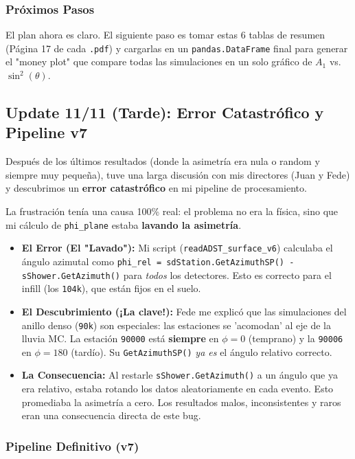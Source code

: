 \subsubsection*{Próximos Pasos}
El plan ahora es claro. El siguiente paso es tomar estas 6 tablas de resumen (Página 17 de cada \lstinline|.pdf|) y cargarlas en un \lstinline|pandas.DataFrame| final para generar el "money plot" que compare todas las simulaciones en un solo gráfico de $A_1$ vs. $\sin^2(\theta)$.

\subsection*{Update 11/11 (Tarde): Error Catastrófico y Pipeline v7}

Después de los últimos resultados (donde la asimetría era nula o random y siempre muy pequeña), tuve una larga discusión con mis directores (Juan y Fede) y descubrimos un \textbf{error catastrófico} en mi pipeline de procesamiento.

La frustración tenía una causa 100\% real: el problema no era la física, sino que mi cálculo de \lstinline|phi_plane| estaba \textbf{lavando la asimetría}.

\begin{itemize}
	\item \textbf{El Error (El "Lavado"):} Mi script (\lstinline|readADST_surface_v6|) calculaba el ángulo azimutal como \lstinline|phi_rel = sdStation.GetAzimuthSP() - sShower.GetAzimuth()| para \textit{todos} los detectores. Esto es correcto para el infill (los \lstinline|104k|), que están fijos en el suelo.
	
	\item \textbf{El Descubrimiento (¡La clave!):} Fede me explicó que las simulaciones del anillo denso (\lstinline|90k|) son especiales: las estaciones se 'acomodan' al eje de la lluvia MC. La estación \lstinline|90000| está \textbf{siempre} en $\phi=0$ (temprano) y la \lstinline|90006| en $\phi=180$ (tardío). Su \lstinline|GetAzimuthSP()| \textit{ya es} el ángulo relativo correcto.
	
	\item \textbf{La Consecuencia:} Al restarle \lstinline|sShower.GetAzimuth()| a un ángulo que ya era relativo, estaba rotando los datos aleatoriamente en cada evento. Esto promediaba la asimetría a cero. Los resultados malos, inconsistentes y raros eran una consecuencia directa de este bug.
\end{itemize}

\subsubsection*{Pipeline Definitivo (v7)}

